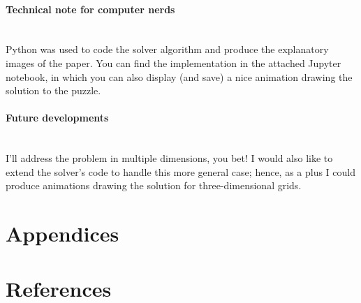 \documentclass[11pt]{article}
\begin{document}
\paragraph{Technical note for computer nerds} \mbox{} \\
Python was used to code the solver algorithm and produce the explanatory images of the paper. You can find the implementation in the attached Jupyter notebook, in which you can also display (and save) a nice animation drawing the solution to the puzzle.

\paragraph{Future developments} \mbox{} \\
I'll address the problem in multiple dimensions, you bet! I would also like to extend the solver's code to handle this more general case; hence, as a plus I could produce animations drawing the solution for three-dimensional grids.

\hypertarget{appendices}{
	\section{Appendices}
	\label{appendices}
}



\hypertarget{references}{
	\section{References}
	\label{references}
}
\end{document}
